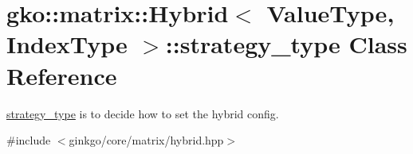\hypertarget{classgko_1_1matrix_1_1Hybrid_1_1strategy__type}{}\section{gko\+:\+:matrix\+:\+:Hybrid$<$ Value\+Type, Index\+Type $>$\+:\+:strategy\+\_\+type Class Reference}
\label{classgko_1_1matrix_1_1Hybrid_1_1strategy__type}


\hyperlink{classgko_1_1matrix_1_1Hybrid_1_1strategy__type}{strategy\+\_\+type} is to decide how to set the hybrid config.  




{\ttfamily \#include $<$ginkgo/core/matrix/hybrid.\+hpp$>$}

